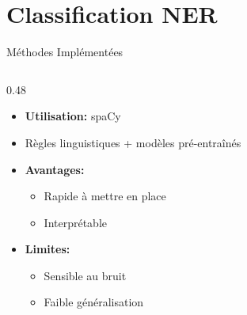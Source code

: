 \documentclass[10pt]{beamer}
\begin{document}
\section{Classification NER}
\begin{frame}{Méthodes Implémentées}
    
    \begin{columns}[T]
        \begin{column}{0.48\textwidth}
            \begin{tcolorbox}[colback=lightred!20, colframe=redforsnnu, title=Rule-based NER]
                \begin{itemize}
                    \item \textbf{Utilisation:} spaCy
                    \item Règles linguistiques + modèles pré-entraînés
                    \item \textbf{Avantages:}
                    \begin{itemize}
                        \item Rapide à mettre en place
                        \item Interprétable
                    \end{itemize}
                    \item \textbf{Limites:}
                    \begin{itemize}
                        \item Sensible au bruit
                        \item Faible généralisation
                    \end{itemize}
                \end{itemize}
            \end{tcolorbox}
        \end{column}
        

\end{columns}
\end{frame}
\end{document}
